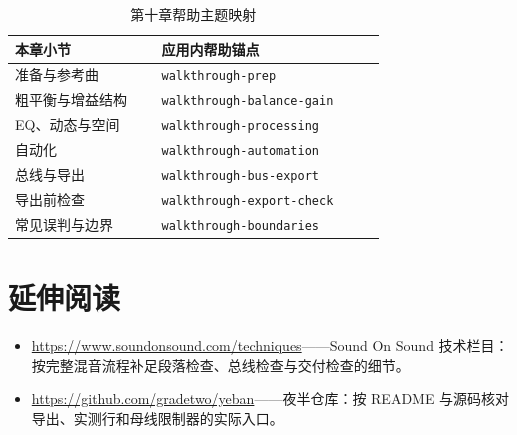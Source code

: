 \begin{table}[htbp]
\centering
\small
\begin{tabular}{@{}p{0.34\linewidth}p{0.52\linewidth}@{}}
\hline
本章小节 & 应用内帮助锚点 \\
\hline
准备与参考曲 & \texttt{walkthrough-prep} \\
粗平衡与增益结构 & \texttt{walkthrough-balance-gain} \\
EQ、动态与空间 & \texttt{walkthrough-processing} \\
自动化 & \texttt{walkthrough-\allowbreak automation} \\
总线与导出 & \texttt{walkthrough-bus-export} \\
导出前检查 & \texttt{walkthrough-export-check} \\
常见误判与边界 & \texttt{walkthrough-boundaries} \\
\hline
\end{tabular}
\caption{第十章帮助主题映射}
\label{tab:walk-help}
\end{table}

\section*{延伸阅读}
\begin{itemize}[leftmargin=1.5em]
\item \url{https://www.soundonsound.com/techniques}——Sound On Sound 技术栏目：按完整混音流程补足段落检查、总线检查与交付检查的细节。
\item \url{https://github.com/gradetwo/yeban}——夜半仓库：按 README 与源码核对导出、实测行和母线限制器的实际入口。
\end{itemize}
